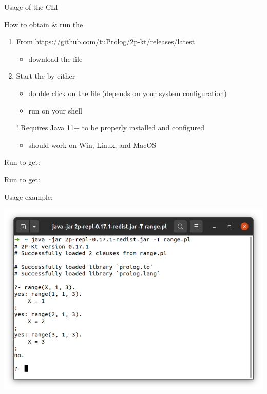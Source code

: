 \documentclass[handout]{beamer}
\begin{document}
\begin{frame}[allowframebreaks]{Usage of the CLI}
    \begin{block}{How to obtain \& run the }
        \begin{enumerate}
            \item From \url{https://github.com/tuProlog/2p-kt/releases/latest}
            \begin{itemize}
                \item download the \alert{} file
            \end{itemize}

            \item Start the  by either
            \begin{itemize}
                \item double click on the file (depends on your system configuration)
                \item run  on your shell
            \end{itemize}

            \item[!] Requires Java 11+ to be properly installed and configured
            \begin{itemize}
                \item should work on Win, Linux, and MacOS
            \end{itemize} 
        \end{enumerate}
    \end{block}

    \framebreak

    Run  to get:

    \framebreak

    Run  to get:

    \framebreak

    Usage example:
    \begin{center}
        \includegraphics[width=.7\linewidth]{img/repl.png}
    \end{center}

\end{frame}
\end{document}
